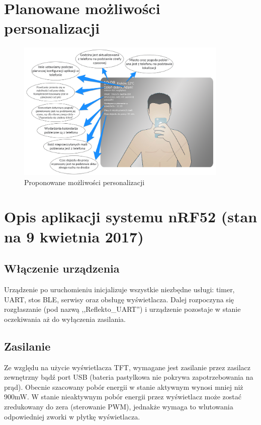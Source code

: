 \documentclass[a4paper,11pt]{article}
\begin{document}
\section{Planowane możliwości personalizacji}
\begin{figure}[H]
	\includegraphics[width=0.9\textwidth,center]{dymki_kreski.png}
	\caption {Proponowane możliwości personalizacji}
	\label{lustro_konf}
\end{figure}

\section{Opis aplikacji systemu nRF52 (stan na 9 kwietnia 2017) }

\subsection{Włączenie urządzenia}
Urządzenie po uruchomieniu inicjalizuje wszystkie niezbędne usługi: timer, UART, stos BLE, serwisy oraz obsługę wyświetlacza. Dalej rozpoczyna się rozgłaszanie (pod nazwą ,,Reflekto\_UART'') i urządzenie pozostaje w stanie oczekiwania aż do wyłączenia zasilania. 

\subsection{Zasilanie}
Ze względu na użycie wyświetlacza TFT, wymagane jest zasilanie przez zasilacz zewnętrzny bądź port USB (bateria pastylkowa nie pokrywa zapotrzebowania na prąd). Obecnie szacowany pobór energii w stanie aktywnym wynosi mniej niż 900mW. W stanie nieaktywnym pobór energii przez wyświetlacz może zostać zredukowany do zera (sterowanie PWM), jednakże wymaga to wlutowania odpowiedniej zworki w płytkę wyświetlacza.
\end{document}
